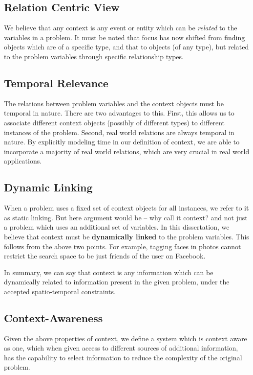\subsection{Relation Centric View}
We believe that any context is any event or entity which can be \textit{related} to the variables in a problem. It must be noted that focus has now shifted from finding objects which are of a specific type, and that to objects (of any type), but related to the problem variables through specific relationship types.

\subsection{Temporal Relevance}
The relations between problem variables and the context objects must be temporal in nature. There are two advantages to this. First, this allows us to associate different context objects (possibly of different types) to different instances of the problem. Second, real world relations are always temporal in nature. By explicitly modeling time in our definition of context, we are able to incorporate a majority of real world relations, which are very crucial in real world applications.

\subsection{Dynamic Linking}
When a problem uses a fixed set of context objects for all instances, we refer to it as static linking. But here argument would be -- why call it context? and not just a problem which uses an additional set of variables. In this dissertation, we believe that context must be \textbf{dynamically linked} to the problem variables. This follows from the above two points. For example, tagging faces in photos cannot restrict the search space to be just friends of the user on Facebook. 

In summary, we can say that context is any information which can be dynamically related to information present in the given problem, under the accepted spatio-temporal constraints.

\subsection{Context-Awareness}
Given the above properties of context, we define a system which is context aware as one, which when given access to different sources of additional information, has the capability to select information to reduce the complexity of the original problem.

